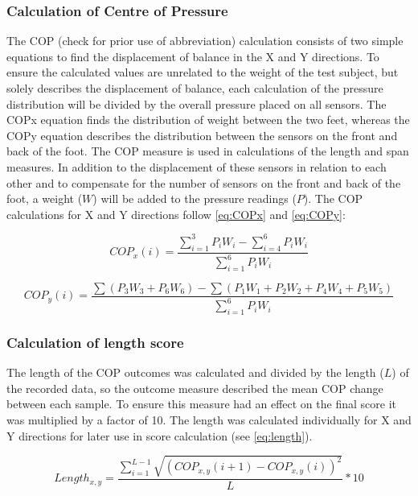 \subsubsection{Calculation of Centre of Pressure}
The COP (check for prior use of abbreviation) calculation consists of two simple equations to find the displacement of balance in the X and Y directions. To ensure the calculated values are unrelated to the weight of the test subject, but solely describes the displacement of balance, each calculation of the pressure distribution will be divided by the overall pressure placed on all sensors. The COP\lowercase{x} equation finds the distribution of weight between the two feet, whereas the COP\lowercase{y} equation describes the distribution between the sensors on the front and back of the foot. The COP measure is used in calculations of the length and span measures. In addition to the displacement of these sensors in relation to each other and to compensate for the number of sensors on the front and back of the foot, a weight ($W$) will be added to the pressure readings ($P$).
The COP calculations for X and Y directions follow \eqref{eq:COPx} and \eqref{eq:COPy}:

\begin{equation} \label{eq:COPx}
COP_x(i) =  \frac{\sum_{i=1}^{3}P_i W_i - \sum_{i=4}^{6}P_i W_i}{\sum_{i=1}^{6}P_i W_i}
\end{equation} 

\begin{equation} \label{eq:COPy}
COP_y(i) =  \frac{\sum(P_3 W_3 + P_6 W_6) - \sum(P_1 W_1+P_2 W_2+P_4 W_4+P_5 W_5)}{\sum_{i=1}^{6}P_i W_i}
\end{equation} 



\subsubsection{Calculation of length score}
The length of the COP outcomes was calculated and divided by the length ($L$) of the recorded data, so the outcome measure described the mean COP change between each sample. To ensure this measure had an effect on the final score it was multiplied by a factor of 10. The length was calculated individually for X and Y directions for later use in score calculation (see \eqref{eq:length}).

\begin{equation} \label{eq:length}
	Length_{x,y} = \frac{\sum_{i=1}^{L-1}\sqrt{(COP_{x,y} (i+1)-COP_{x,y} (i))^2}}{L} * 10
\end{equation}


